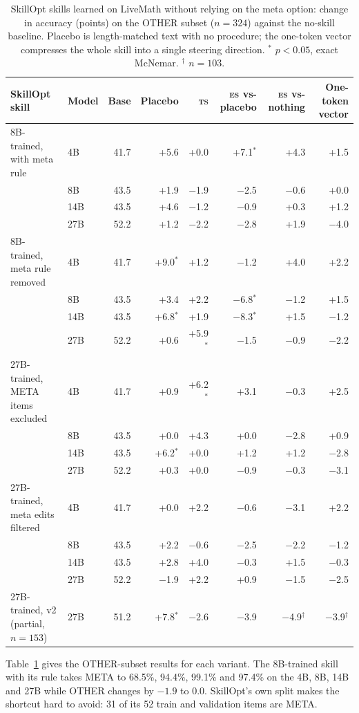 \documentclass[11pt]{article}
\newcommand{\TS}{\textsc{ts}}
\newcommand{\ES}{\textsc{es}}
\begin{document}
\begin{table}[t]
\centering\small
\begin{tabular}{@{}llrrrrrr@{}}
\toprule
SkillOpt skill & Model & Base & Placebo & \TS & \ES{} vs-placebo & \ES{} vs-nothing & One-token vector \\
\midrule
8B-trained, with meta rule & 4B & 41.7 & +5.6 & +0.0 & +7.1$^*$ & +4.3 & +1.5 \\
 & 8B & 43.5 & +1.9 & $-$1.9 & $-$2.5 & $-$0.6 & +0.0 \\
 & 14B & 43.5 & +4.6 & $-$1.2 & $-$0.9 & +0.3 & +1.2 \\
 & 27B & 52.2 & +1.2 & $-$2.2 & $-$2.8 & +1.9 & $-$4.0 \\
\midrule
8B-trained, meta rule removed & 4B & 41.7 & +9.0$^*$ & +1.2 & $-$1.2 & +4.0 & +2.2 \\
 & 8B & 43.5 & +3.4 & +2.2 & $-$6.8$^*$ & $-$1.2 & +1.5 \\
 & 14B & 43.5 & +6.8$^*$ & +1.9 & $-$8.3$^*$ & +1.5 & $-$1.2 \\
 & 27B & 52.2 & +0.6 & +5.9$^*$ & $-$1.5 & $-$0.9 & $-$2.2 \\
\midrule
27B-trained, META items excluded & 4B & 41.7 & +0.9 & +6.2$^*$ & +3.1 & $-$0.3 & +2.5 \\
 & 8B & 43.5 & +0.0 & +4.3 & +0.0 & $-$2.8 & +0.9 \\
 & 14B & 43.5 & +6.2$^*$ & +0.0 & +1.2 & +1.2 & $-$2.8 \\
 & 27B & 52.2 & +0.3 & +0.0 & $-$0.9 & $-$0.3 & $-$3.1 \\
\midrule
27B-trained, meta edits filtered & 4B & 41.7 & +0.0 & +2.2 & $-$0.6 & $-$3.1 & +2.2 \\
 & 8B & 43.5 & +2.2 & $-$0.6 & $-$2.5 & $-$2.2 & $-$1.2 \\
 & 14B & 43.5 & +2.8 & +4.0 & $-$0.3 & +1.5 & $-$0.3 \\
 & 27B & 52.2 & $-$1.9 & +2.2 & +0.9 & $-$1.5 & $-$2.5 \\
\midrule
27B-trained, v2 (partial, $n=153$) & 27B & 51.2 & +7.8$^*$ & $-$2.6 & $-$3.9 & $-$4.9$^\dagger$ & $-$3.9$^\dagger$ \\
\bottomrule
\end{tabular}
\caption{SkillOpt skills learned on LiveMath without relying on the meta option: change in accuracy
(points) on the OTHER subset ($n=324$) against the no-skill baseline. Placebo is length-matched text
with no procedure; the one-token vector compresses the whole skill into a single steering direction.
$^{*}$ $p<0.05$, exact McNemar. $^\dagger$ $n=103$.}
\label{tab:skillopt}
\end{table}
Table~\ref{tab:skillopt} gives the OTHER-subset results for each variant. The
8B-trained skill with its rule takes META to 68.5\%, 94.4\%, 99.1\% and 97.4\% on the 4B, 8B, 14B
and 27B while OTHER changes by $-1.9$ to $0.0$. SkillOpt's own split makes the shortcut hard to
avoid: 31 of its 52 train and validation items are META.
\end{document}
